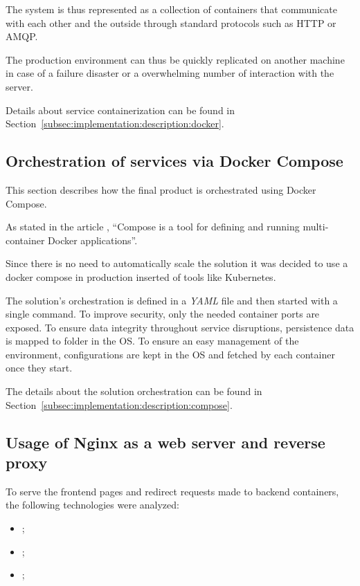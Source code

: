 The system is thus represented as a collection of containers that communicate with each other and the outside through standard protocols such as HTTP or AMQP.

The production environment can thus be quickly replicated on another machine in case of a failure disaster or a overwhelming number of interaction with the server.

Details about service containerization can be found in Section~\ref{subsec:implementation:description:docker}.

\subsection{Orchestration of services via Docker Compose}
\label{subsec:implementation:decisions:compose}

This section describes how the final product is orchestrated using Docker Compose.

As stated in the article , ``Compose is a tool for defining and running multi-container Docker applications''. 

Since there is no need to automatically scale the solution it was decided to use a docker compose in production inserted of tools like Kubernetes.

The solution's orchestration is defined in a \textit{YAML} file and then started with a single command. To improve security, only the needed container ports are exposed. To ensure data integrity throughout service disruptions, persistence data is mapped to folder in the \gls{OS}. To ensure an easy management of the environment, configurations are kept in the \gls{OS} and fetched by each container once they start.

The details about the solution orchestration can be found in Section~\ref{subsec:implementation:description:compose}.

\subsection{Usage of Nginx as a web server and reverse proxy}
\label{subsec:implementation:decisions:nginx}

To serve the frontend pages and redirect requests made to backend containers, the following technologies were analyzed:

\begin{itemize}
    \item {};
    \item {};
    \item {};
\end{itemize}

